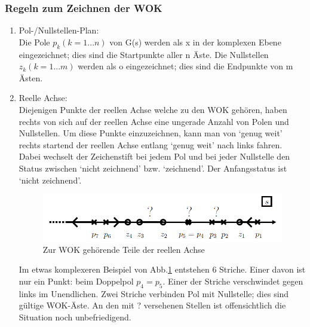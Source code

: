 \subsubsection{Regeln zum Zeichnen der WOK}
\begin{enumerate}
\item Pol-/Nullstellen-Plan:\\
Die Pole $p_k (k = 1...n)$ von G(s) werden als x in der komplexen Ebene eingezeichnet;
dies sind die Startpunkte aller n Äste. Die Nullstellen $z_k (k = 1...m)$
werden als o eingezeichnet; dies sind die Endpunkte von m Ästen.
\item Reelle Achse:\\
Diejenigen Punkte der reellen Achse welche zu den WOK gehören, haben rechts
von sich auf der reellen Achse eine ungerade Anzahl von Polen und Nullstellen.
Um diese Punkte einzuzeichnen, kann man von ‘genug weit’ rechts startend
der reellen Achse entlang ‘genug weit’ nach links fahren. Dabei wechselt der
Zeichenstift bei jedem Pol und bei jeder Nullstelle den Status zwischen ‘nicht
zeichnend’ bzw. ‘zeichnend’. Der Anfangsstatus ist ‘nicht zeichnend’.
\begin{figure}[h!]
\includegraphics[width=12cm]{./images/reelleAchsePoleNullWOK.png}
\caption{Zur WOK gehörende Teile der reellen Achse}
\label{beispielAchse}
\end{figure}

Im etwas komplexeren Beispiel von Abb.\ref{beispielAchse} entstehen 6 Striche. Einer davon
ist nur ein Punkt: beim Doppelpol $p_4 = p_5$. Einer der Striche verschwindet
gegen links im Unendlichen. Zwei Striche verbinden Pol mit Nullstelle; dies
sind gültige WOK-Äste. An den mit ? versehenen Stellen ist offensichtlich die
Situation noch unbefriedigend.



\end{enumerate}
